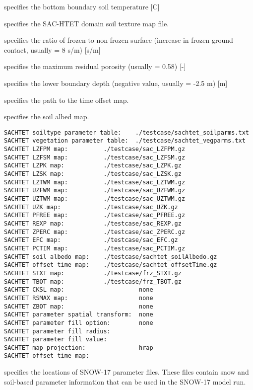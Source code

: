   specifies the
 bottom boundary soil temperature [C]

  specifies the SAC-HTET domain soil texture map file.

  specifies the
 ratio of frozen to non-frozen surface (increase in frozen ground contact, usually = 8 s/m) [s/m]

  specifies the
 maximum residual porosity (usually = 0.58) [-]

  specifies the
 lower boundary depth (negative value, usually = -2.5 m) [m]

  specifies the path to the
  time offset map.

  specifies the soil albed map.

 

 \begin{Verbatim}[frame=single]
SACHTET soiltype parameter table:    ./testcase/sachtet_soilparms.txt
SACHTET vegetation parameter table:  ./testcase/sachtet_vegparms.txt
SACHTET LZFPM map:          ./testcase/sac_LZFPM.gz
SACHTET LZFSM map:          ./testcase/sac_LZFSM.gz
SACHTET LZPK map:           ./testcase/sac_LZPK.gz
SACHTET LZSK map:           ./testcase/sac_LZSK.gz
SACHTET LZTWM map:          ./testcase/sac_LZTWM.gz
SACHTET UZFWM map:          ./testcase/sac_UZFWM.gz
SACHTET UZTWM map:          ./testcase/sac_UZTWM.gz
SACHTET UZK map:            ./testcase/sac_UZK.gz
SACHTET PFREE map:          ./testcase/sac_PFREE.gz
SACHTET REXP map:           ./testcase/sac_REXP.gz
SACHTET ZPERC map:          ./testcase/sac_ZPERC.gz
SACHTET EFC map:            ./testcase/sac_EFC.gz
SACHTET PCTIM map:          ./testcase/sac_PCTIM.gz
SACHTET soil albedo map:    ./testcase/sachtet_soilAlbedo.gz
SACHTET offset time map:    ./testcase/sachtet_offsetTime.gz
SACHTET STXT map:           ./testcase/frz_STXT.gz
SACHTET TBOT map:           ./testcase/frz_TBOT.gz
SACHTET CKSL map:                     none
SACHTET RSMAX map:                    none
SACHTET ZBOT map:                     none
SACHTET parameter spatial transform:  none
SACHTET parameter fill option:        none
SACHTET parameter fill radius:
SACHTET parameter fill value:
SACHTET map projection:               hrap
SACHTET offset time map:
 \end{Verbatim}

 
  specifies the locations of SNOW-17 
 parameter files.  These files contain snow and soil-based
 parameter information that can be used in the SNOW-17 model run.

